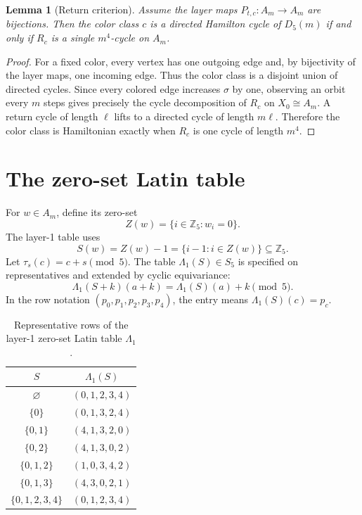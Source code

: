 \documentclass[11pt]{article}
\newtheorem{lemma}{Lemma}
\theoremstyle{definition}
\newcommand{\Zfive}{\mathbb Z_5}
\begin{document}
\begin{lemma}[Return criterion]\label{lem:return}
Assume the layer maps \(P_{t,c}:A_m\to A_m\) are bijections.  Then the color class \(c\) is a directed
Hamilton cycle of \(D_5(m)\) if and only if \(R_c\) is a single \(m^4\)-cycle on \(A_m\).
\end{lemma}

\begin{proof}
For a fixed color, every vertex has one outgoing edge and, by bijectivity of the layer maps, one
incoming edge.  Thus the color class is a disjoint union of directed cycles.  Since every colored edge
increases \(\sigma\) by one, observing an orbit every \(m\) steps gives precisely the cycle decomposition
of \(R_c\) on \(X_0\cong A_m\).  A return cycle of length \(\ell\) lifts to a directed cycle of length
\(m\ell\).  Therefore the color class is Hamiltonian exactly when \(R_c\) is one cycle of length
\(m^4\).
\end{proof}

\section{The zero-set Latin table}\label{sec:zero-set-table}

For \(w\in A_m\), define its zero-set
\[
Z(w)=\{i\in\Zfive:w_i=0\}.
\]
The layer-1 table uses
\[
S(w)=Z(w)-1=\{i-1:i\in Z(w)\}\subseteq\Zfive.
\]
Let \(\tau_s(c)=c+s\pmod 5\).  The table \(\Lambda_1(S)\in S_5\) is specified on representatives and
extended by cyclic equivariance:
\[
\Lambda_1(S+k)(a+k)=\Lambda_1(S)(a)+k\pmod 5.
\]
In the row notation \((p_0,p_1,p_2,p_3,p_4)\), the entry means \(\Lambda_1(S)(c)=p_c\).

\begin{table}[h]
\centering
\caption{Representative rows of the layer-1 zero-set Latin table \(\Lambda_1\).}\label{tab:lambda}
\begin{tabular}{c c}
\toprule
\(S\) & \(\Lambda_1(S)\) \\
\midrule
\(\varnothing\) & \((0,1,2,3,4)\) \\
\(\{0\}\) & \((0,1,3,2,4)\) \\
\(\{0,1\}\) & \((4,1,3,2,0)\) \\
\(\{0,2\}\) & \((4,1,3,0,2)\) \\
\(\{0,1,2\}\) & \((1,0,3,4,2)\) \\
\(\{0,1,3\}\) & \((4,3,0,2,1)\) \\
\(\{0,1,2,3,4\}\) & \((0,1,2,3,4)\) \\
\bottomrule
\end{tabular}
\end{table}
\end{document}
